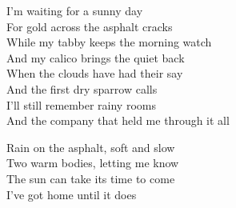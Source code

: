 \begin{lyrics}
I'm waiting for a sunny day\\
For gold across the asphalt cracks\\
While my tabby keeps the morning watch\\
And my calico brings the quiet back\\
When the clouds have had their say\\
And the first dry sparrow calls\\
I'll still remember rainy rooms\\
And the company that held me through it all

Rain on the asphalt, soft and slow\\
Two warm bodies, letting me know\\
The sun can take its time to come\\
I've got home until it does
\end{lyrics}

